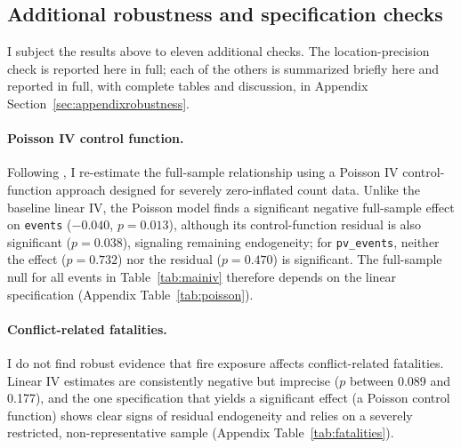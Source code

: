 \documentclass[12pt]{article}
\begin{document}
\subsection{Additional robustness and specification checks}
\label{sec:robustness-summary}

I subject the results above to eleven additional checks. The location-precision check is reported here in full; each of the others is summarized briefly here and reported in full, with complete tables and discussion, in Appendix Section~\ref{sec:appendixrobustness}.

\paragraph{Poisson IV control function.} Following \citet{lu2023fish}, I re-estimate the full-sample relationship using a Poisson IV control-function approach \citep{terzabasurathouz2008} designed for severely zero-inflated count data. Unlike the baseline linear IV, the Poisson model finds a significant negative full-sample effect on \texttt{events} ($-0.040$, $p=0.013$), although its control-function residual is also significant ($p=0.038$), signaling remaining endogeneity; for \texttt{pv\_events}, neither the effect ($p=0.732$) nor the residual ($p=0.470$) is significant. The full-sample null for all events in Table~\ref{tab:mainiv} therefore depends on the linear specification (Appendix Table~\ref{tab:poisson}).

\paragraph{Conflict-related fatalities.} I do not find robust evidence that fire exposure affects conflict-related fatalities. Linear IV estimates are consistently negative but imprecise ($p$ between 0.089 and 0.177), and the one specification that yields a significant effect (a Poisson control function) shows clear signs of residual endogeneity and relies on a severely restricted, non-representative sample (Appendix Table~\ref{tab:fatalities}).
\end{document}
